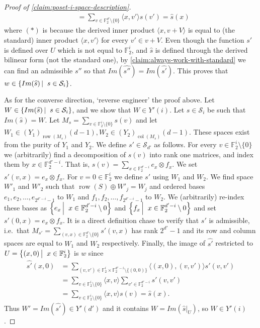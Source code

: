 \documentclass[10pt,a4paper]{article}
\newcommand{\prettyref}[1]{\cref{#1}}
\theoremstyle{definition}
\theoremstyle{remark}
\newcommand\sett[2]{\left\{ #1 \left| \; \vphantom{#1 #2} \right. #2  \right\}}
\newcommand{\set}[1]{\{#1\}}
\newcommand{\iprod}[1]{\langle#1\rangle}
\newcommand{\F}{\mathbb{F}}
\DeclareMathOperator{\row}{row}
\DeclareMathOperator{\col}{col}
\numberwithin{equation}{section}
\let\pref=\prettyref
\def\Y{Y}
\def\diml{d}
\def\dimlin{{\diml}}
\def\dimloutfull{{\diml'}}
\begin{document}
\begin{proof}[Proof of \pref{claim:poset-i-space-description}]
\begin{align*}
        &= \sum_{v \in \F_2^{\dimloutfull} \setminus \set{0}} \iprod{x,v'} s(v') = \widehat{s}(x)
    \end{align*}
    where \((*)\) is because the derived inner product \(\iprod{x,v+V}\) is equal to (the standard) inner product \(\iprod{x,v'}\) for every \(v' \in v+V\). Even though the function \(s'\) is defined over \(U\) which is not equal to \(\F_2^i\), and \(\widehat{s}\) is defined through the derived bilinear form (not the standard one), by \pref{claim:always-work-with-standard} we can find an admissible \(s''\) so that \(Im(\widehat{s''})=Im(\widehat{s'})\). This proves that \(w \in \sett{Im(\widehat{s})}{s \in \mathcal{S}_i}\).

    As for the converse direction, `reverse engineer' the proof above. Let \(W \in \sett{Im(\widehat{s})}{s \in \mathcal{S}_i}\), and we show that \(W \in \Y'(i)\). Let \(s \in \mathcal{S}_i\) be such that \(Im(\widehat{s}) = W\). Let \(M_s = \sum_{v \in \F_2^i \setminus \set{0}}s(v)\) and let \(W_1 \in (\Y_1)_{\row(M_s)}(\dimlin - 1), W_2 \in (\Y_2)_{\col(M_s)}(\dimlin - 1)\). These spaces exist from the purity of \(\Y_1\) and \(\Y_2\). We define \(s' \in \mathcal{S}_{\dimloutfull}\) as follows. For every \(v \in \F_2^{i} \setminus \set{0}\) we (arbitrarily) find a decomposition of \(s(v)\) into rank one matrices, and index them by \(x \in \F_2^{\dimloutfull-i}\). That is, \(s(v) = \sum_{x \in \F_2^{\dimloutfull-i}} e_x \otimes f_x\). We set \(s'(v,x) = e_x \otimes f_x\). For \(v=0 \in \F_2^i\) we define \(s'\) using \(W_1\) and \(W_2\). We find space \(W'_1\) and \(W'_2\) such that \(\row(S) \oplus W'_j = W_j\) and ordered bases \(e_1,e_2,\dots,e_{2^{\dimloutfull-i}-1}\) to \(W_1\) and \(f_1,f_2,\dots,f_{2^{\dimloutfull-i}-1}\) to \(W_2\). We (arbitrarily) re-index these bases as \(\sett{e_x}{x \in \F_2^{\dimloutfull-i} \setminus 0}\) and \(\sett{f_x}{x \in \F_2^{\dimloutfull-i} \setminus 0}\) and set \(s'(0,x) = e_x \otimes f_x\). It is a direct definition chase to verify that \(s'\) is admissible, i.e.\ that \(M_{s'} = \sum_{(v,x) \in \F_2^{\dimloutfull} \setminus \set{0}} s'(v,x)\) has rank \(2^\dimloutfull -1\) and its row and column spaces are equal to \(W_1\) and \(W_2\) respectively. Finally, the image of \(\widehat{s'}\) restricted to \(U = \sett{(x,0)}{x \in \F_2^i}\) is \(w\) since
    \begin{align*}
        \widehat{s'}(x,0) &= \sum_{(v,v') \in \F_2^i \times \F_2^{\dimloutfull - i} \setminus \set{(0,0)}} \iprod{(x,0),(v,v')} s'(v,v')\\
        &= \sum_{v \in \F_2^i \setminus \set{0}} \iprod{x,v} \sum_{v' \in \F_2^{\dimloutfull - i}}s'(v,v') \\
        &= 
        \sum_{v \in \F_2^i \setminus \set{0}} \iprod{x,v} s(v) = \widehat{s}(x).
    \end{align*}
    Thus \(W' = Im(\widehat{s'}) \in \Y'(\dimloutfull)\) and it contains \(W=Im(\widehat{s}|_U)\), so \(W \in \Y'(i)\).
\end{proof}
\end{document}
